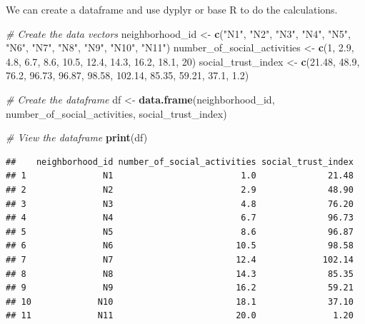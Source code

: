 \documentclass[
  11pt,
]{article}
\newenvironment{Shaded}{\begin{snugshade}}{\end{snugshade}}
\newcommand{\CommentTok}[1]{\textcolor[rgb]{0.56,0.35,0.01}{\textit{#1}}}
\newcommand{\DecValTok}[1]{\textcolor[rgb]{0.00,0.00,0.81}{#1}}
\newcommand{\FloatTok}[1]{\textcolor[rgb]{0.00,0.00,0.81}{#1}}
\newcommand{\FunctionTok}[1]{\textcolor[rgb]{0.13,0.29,0.53}{\textbf{#1}}}
\newcommand{\NormalTok}[1]{#1}
\newcommand{\OtherTok}[1]{\textcolor[rgb]{0.56,0.35,0.01}{#1}}
\newcommand{\StringTok}[1]{\textcolor[rgb]{0.31,0.60,0.02}{#1}}
\begin{document}
We can create a dataframe and use dyplyr or base R to do the
calculations.

\begin{Shaded}
\begin{Highlighting}[]
\CommentTok{\# Create the data vectors}
\NormalTok{neighborhood\_id }\OtherTok{\textless{}{-}} \FunctionTok{c}\NormalTok{(}\StringTok{"N1"}\NormalTok{, }\StringTok{"N2"}\NormalTok{, }\StringTok{"N3"}\NormalTok{, }\StringTok{"N4"}\NormalTok{, }\StringTok{"N5"}\NormalTok{, }\StringTok{"N6"}\NormalTok{, }\StringTok{"N7"}\NormalTok{, }\StringTok{"N8"}\NormalTok{, }\StringTok{"N9"}\NormalTok{, }\StringTok{"N10"}\NormalTok{,}
    \StringTok{"N11"}\NormalTok{)}
\NormalTok{number\_of\_social\_activities }\OtherTok{\textless{}{-}} \FunctionTok{c}\NormalTok{(}\DecValTok{1}\NormalTok{, }\FloatTok{2.9}\NormalTok{, }\FloatTok{4.8}\NormalTok{, }\FloatTok{6.7}\NormalTok{, }\FloatTok{8.6}\NormalTok{, }\FloatTok{10.5}\NormalTok{, }\FloatTok{12.4}\NormalTok{, }\FloatTok{14.3}\NormalTok{, }\FloatTok{16.2}\NormalTok{, }\FloatTok{18.1}\NormalTok{,}
    \DecValTok{20}\NormalTok{)}
\NormalTok{social\_trust\_index }\OtherTok{\textless{}{-}} \FunctionTok{c}\NormalTok{(}\FloatTok{21.48}\NormalTok{, }\FloatTok{48.9}\NormalTok{, }\FloatTok{76.2}\NormalTok{, }\FloatTok{96.73}\NormalTok{, }\FloatTok{96.87}\NormalTok{, }\FloatTok{98.58}\NormalTok{, }\FloatTok{102.14}\NormalTok{, }\FloatTok{85.35}\NormalTok{, }\FloatTok{59.21}\NormalTok{,}
    \FloatTok{37.1}\NormalTok{, }\FloatTok{1.2}\NormalTok{)}

\CommentTok{\# Create the dataframe}
\NormalTok{df }\OtherTok{\textless{}{-}} \FunctionTok{data.frame}\NormalTok{(neighborhood\_id, number\_of\_social\_activities, social\_trust\_index)}

\CommentTok{\# View the dataframe}
\FunctionTok{print}\NormalTok{(df)}
\end{Highlighting}
\end{Shaded}

\begin{verbatim}
##    neighborhood_id number_of_social_activities social_trust_index
## 1               N1                         1.0              21.48
## 2               N2                         2.9              48.90
## 3               N3                         4.8              76.20
## 4               N4                         6.7              96.73
## 5               N5                         8.6              96.87
## 6               N6                        10.5              98.58
## 7               N7                        12.4             102.14
## 8               N8                        14.3              85.35
## 9               N9                        16.2              59.21
## 10             N10                        18.1              37.10
## 11             N11                        20.0               1.20
\end{verbatim}
\end{document}
